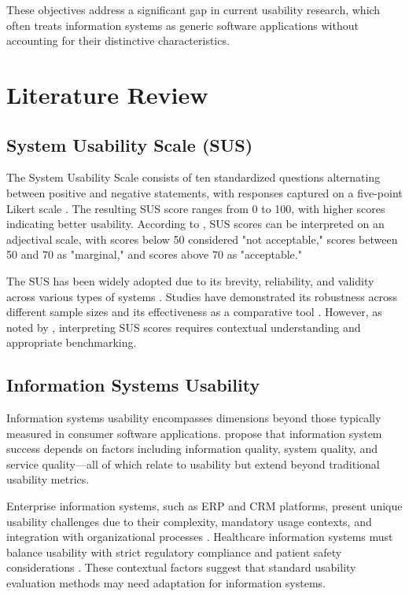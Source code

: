 \documentclass[blindrev]{informs3}
\begin{document}
These objectives address a significant gap in current usability research, which often treats information systems as generic software applications without accounting for their distinctive characteristics.

\section{Literature Review}\label{literature}

\subsection{System Usability Scale (SUS)}\label{sus-background}

The System Usability Scale consists of ten standardized questions alternating between positive and negative statements, with responses captured on a five-point Likert scale \citep{Brooke1996}. The resulting SUS score ranges from 0 to 100, with higher scores indicating better usability. According to \citet{Bangor2009}, SUS scores can be interpreted on an adjectival scale, with scores below 50 considered "not acceptable," scores between 50 and 70 as "marginal," and scores above 70 as "acceptable."

The SUS has been widely adopted due to its brevity, reliability, and validity across various types of systems \citep{Lewis2018}. Studies have demonstrated its robustness across different sample sizes and its effectiveness as a comparative tool \citep{Tullis2004}. However, as noted by \citet{Sauro2011}, interpreting SUS scores requires contextual understanding and appropriate benchmarking.

\subsection{Information Systems Usability}\label{is-usability}

Information systems usability encompasses dimensions beyond those typically measured in consumer software applications. \citet{DeLone2003} propose that information system success depends on factors including information quality, system quality, and service quality—all of which relate to usability but extend beyond traditional usability metrics.

Enterprise information systems, such as ERP and CRM platforms, present unique usability challenges due to their complexity, mandatory usage contexts, and integration with organizational processes \citep{Topi2005}. Healthcare information systems must balance usability with strict regulatory compliance and patient safety considerations \citep{Zhang2011}. These contextual factors suggest that standard usability evaluation methods may need adaptation for information systems.
\end{document}
